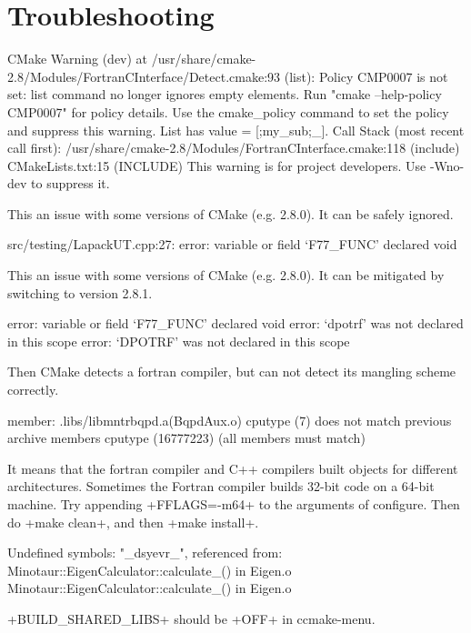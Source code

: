 
\section{Troubleshooting}
\begin{codeenv}
 CMake Warning (dev) at /usr/share/cmake-2.8/Modules/FortranCInterface/Detect.cmake:93 (list):
   Policy CMP0007 is not set: list command no longer ignores empty elements.
   Run "cmake --help-policy CMP0007" for policy details.  Use the cmake_policy
   command to set the policy and suppress this warning.  List has value =
   [;my_sub;_].
 Call Stack (most recent call first):
   /usr/share/cmake-2.8/Modules/FortranCInterface.cmake:118 (include)
   CMakeLists.txt:15 (INCLUDE)
 This warning is for project developers.  Use -Wno-dev to suppress it.
\end{codeenv}
This an issue with some versions of CMake (e.g. 2.8.0). It can be safely
ignored.

\begin{codeenv}
src/testing/LapackUT.cpp:27: error: variable or field ‘F77_FUNC’ declared void
\end{codeenv}
This an issue with some versions of CMake (e.g. 2.8.0). It can be mitigated by
switching to version 2.8.1.

\begin{codeenv}
error: variable or field `F77_FUNC' declared void
error: `dpotrf' was not declared in this scope
error: `DPOTRF' was not declared in this scope
\end{codeenv}
Then CMake detects a fortran compiler, but can not
detect its mangling scheme correctly.


\begin{codeenv}
member: .libs/libmntrbqpd.a(BqpdAux.o) cputype (7) does not 
match previous archive members cputype (16777223) 
(all members must match)
\end{codeenv}

It means that the fortran compiler and C++ compilers built objects for different
architectures. Sometimes the Fortran compiler builds 32-bit code on a 64-bit
machine. Try appending \code+FFLAGS=-m64+ to the arguments of configure. Then do 
\code+make clean+, and then \code+make install+.

\begin{codeenv}
Undefined symbols:
  "_dsyevr_", referenced from:
      Minotaur::EigenCalculator::calculate_()      in Eigen.o
      Minotaur::EigenCalculator::calculate_()      in Eigen.o
\end{codeenv}
\code+BUILD_SHARED_LIBS+ should be \code+OFF+ in ccmake-menu.

